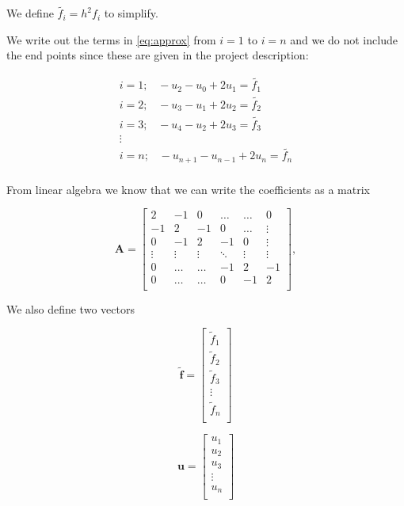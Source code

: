 \documentclass[oneside, final, 11pt, english, twocolumn]{article}
\begin{document}
We define $\tilde{f_i} = h^2 f_i$ to simplify. 

We write out the terms in \eqref{eq:approx} from $i = 1$ to $i = n$ and we do not include the end points since these are given in the project description: 


\begin{align*}
i = 1; \, \, \, \, \, -u_2 - u_0 + 2u_1 = \tilde{f_1} \\
i = 2; \, \, \, \, \, -u_3 - u_1 + 2u_2 = \tilde{f_2} \\
i = 3; \, \, \, \, \, -u_4 - u_2 + 2u_3 = \tilde{f_3} \\
\vdots \\
i = n; \, \, \, \, \, -u_{n+1} - u_{n-1} + 2u_n = \tilde{f_n} \\
\end{align*}

From linear algebra we know that we can write the coefficients as a matrix

\[
    \mathbf{A} = \begin{bmatrix}
                           2& -1& 0 &\dots   & \dots &0 \\
                           -1 & 2 & -1 &0 &\dots &\vdots \\
                           0&-1 &2 & -1 & 0 & \vdots \\
                           \vdots & \vdots   & \vdots &\ddots   &\vdots & \vdots \\
                           0&\dots   &  \dots &-1 &2& -1 \\
                           0&\dots    &  \dots & 0  &-1 & 2 \\
                      \end{bmatrix},
\]

We also define two vectors

\[
\tilde{\mathbf{f}} = 
\left[ {\begin{array}{ccc}
\tilde{f}_1  \\
\tilde{f}_2  \\
\tilde{f}_3 \\
\vdots \\
\tilde{f}_n \\
\end{array} } \right]
\]

\[
\mathbf{u} = 
\left[ {\begin{array}{ccc}
u_1  \\
u_2  \\
u_3 \\
\vdots \\
u_n \\
\end{array} } \right]
\]
\end{document}
